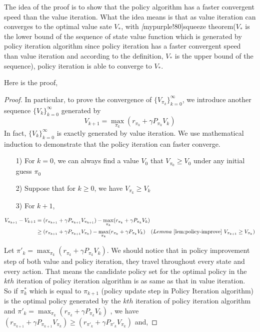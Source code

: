 \begin{remark}
	The idea of the proof is to show that the policy algorithm has a faster convergent speed than the value iteration. What the idea means is that as value iteration can converges to the optimal value sate $V_{*}$, with \emph[mypurple!80]{squeeze theorem}($V_{*}$ is the lower bound of the sequence of state value function which is generated by policy iteration algorithm since policy iteration has a faster convergent speed than value iteration and according to the definition, $V_{*}$ is the upper bound of the sequence), policy iteration is able to converge to $V_{*}$.
\end{remark}
Here is the proof,
\begin{proof}
	In particular, to prove the convergence of $\{V_{\pi_{k}}\}_{k=0}^{\infty}$, we introduce another sequence $\{V_{k}\}_{k=0}^{\infty}$ generated by
	\begin{equation}
		V_{k+1}=\max_{\pi_{k}}\left(r_{\pi_{k}}+\gamma P_{\pi_{k}}V_{k}\right)
	\end{equation}
	In fact, $\{V_{k}\}_{k=0}^{\infty}$ is exactly generated by value iteration. We use mathematical induction to demonstrate that the policy iteration can faster converge.
	\begin{enumerate}
		\item[1)] For $k=0$, we can always find a value $V_{0}$ that $V_{\pi_{0}} \ge V_{0}$ under any initial guess $\pi_{0}$
		\item[2)] Suppose that for $k\ge 0$, we have $V_{\pi_{k}}\ge V_{k}$
		\item[3)] For $k+1$,
	\end{enumerate}
	\begin{align*}
		V_{\pi_{k+1}}-V_{k+1} & = (r_{\pi_{k+1}}+\gamma P_{\pi_{k+1}}V_{\pi_{k+1}})-\max_{\pi_{k}}(r_{\pi_{k}}+\gamma P_{\pi_{k}}V_{k})                                                                      \\
		                      & \ge (r_{\pi_{k+1}}+\gamma P_{\pi_{k+1}}V_{\pi_{k}})-\max_{\pi_{k}}(r_{\pi_{k}}+\gamma P_{\pi_{k}}V_{k}) \quad(Lemma\ \ref{lem:policy-improve}\ V_{\pi_{k+1}}\ge V_{\pi_{k}}) \\
	\end{align*}

	Let $\pi'_{k}=\max_{\pi_{k}}(r_{\pi_{k}}+\gamma P_{\pi_{k}}V_{k})$. We should notice that in policy improvement step of both value and policy
	iteration, they travel throughout every state and every action. That means the candidate policy set for the optimal policy in the $kth$
	iteration of policy iteration algorithm is as same as that in value iteration. \\[6pt]
	So if $\pi^*_{k}$ which is equal to $\pi_{k+1}$ (policy update step in Policy Iteration algorithm) is the optimal policy generated by the $kth$ iteration of policy iteration algorithm and $\pi'_{k}=\max_{\pi_{k}}(r_{\pi_{k}}+\gamma P_{\pi_{k}}V_{k})$ , we have $(r_{\pi_{k+1}}+\gamma P_{\pi_{k+1}}V_{\pi_{k}}) \ge (r_{\pi'_{k}}+\gamma P_{\pi'_{k}}V_{\pi_{k}})$ and,


\end{proof}
